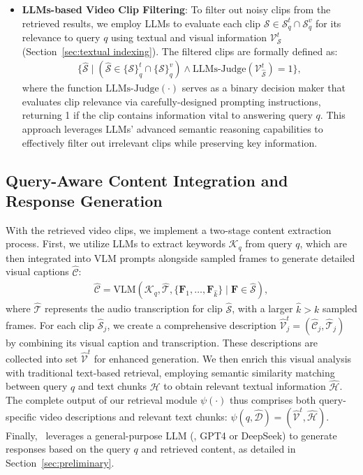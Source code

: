 \begin{itemize}[leftmargin=*]
    \item \textbf{LLMs-based Video Clip Filtering}: To filter out noisy clips from the retrieved results, we employ LLMs to evaluate each clip $\mathcal{S} \in {\mathcal{S}}_{q}^{t} \cap {\mathcal{S}}_{q}^{v}$ for its relevance to query $q$ using textual and visual information $\mathcal{V}^{t}_{\mathcal{S}}$ (Section~\ref{sec:textual indexing}). The filtered clips are formally defined as:
    \begin{align}
        \{\hat{\mathcal{S}} \mid (\hat{\mathcal{S}} \in \{\mathcal{S}\}_{q}^{t} \cap \{\mathcal{S}\}_{q}^{v}) \land  \text{LLMs-Judge}(\mathcal{V}^{t}_{\hat{\mathcal{S}}}) = 1\},
    \end{align}
    where the function $\text{LLMs-Judge}(\cdot)$ serves as a binary decision maker that evaluates clip relevance via carefully-designed prompting instructions, returning 1 if the clip contains information vital to answering query $q$. This approach leverages LLMs' advanced semantic reasoning capabilities to effectively filter out irrelevant clips while preserving key information.
    
\end{itemize}

\subsection{Query-Aware Content Integration and Response Generation}

With the retrieved video clips, we implement a two-stage content extraction process. First, we utilize LLMs to extract keywords $\mathcal{K}_{q}$ from query $q$, which are then integrated into VLM prompts alongside sampled frames to generate detailed visual captions $\hat{\mathcal{C}}$:
\begin{align}
    \hat{\mathcal{C}} = \text{VLM}(\mathcal{K}_q, \hat{\mathcal{T}}, \{\textbf{F}_1, \ldots, \textbf{F}_{\hat{k}}\} \mid \textbf{F} \in \hat{\mathcal{S}}),
\end{align}
where $\hat{\mathcal{T}}$ represents the audio transcription for clip $\hat{\mathcal{S}}$, with a larger $\hat{k} > k$ sampled frames. For each clip $\hat{\mathcal{S}}_j$, we create a comprehensive description $\hat{\mathcal{V}}_j^{t} = (\hat{\mathcal{C}}_j, \hat{\mathcal{T}}_j)$ by combining its visual caption and transcription. These descriptions are collected into set ${ \hat{\mathcal{V}}^{t} }$ for enhanced generation. We then enrich this visual analysis with traditional text-based retrieval, employing semantic similarity matching between query $q$ and text chunks ${ \mathcal{H} }$ to obtain relevant textual information ${ \hat{\mathcal{H}} }$. The complete output of our retrieval module $\psi(\cdot)$ thus comprises both query-specific video descriptions and relevant text chunks: $\psi(q, \hat{\mathcal{D}}) = ({ \hat{\mathcal{V}}^{t} }, { \hat{\mathcal{H}} })$. Finally, \model\ leverages a general-purpose LLM (\eg, GPT4 or DeepSeek) to generate responses based on the query $q$ and retrieved content, as detailed in Section~\ref{sec:preliminary}.